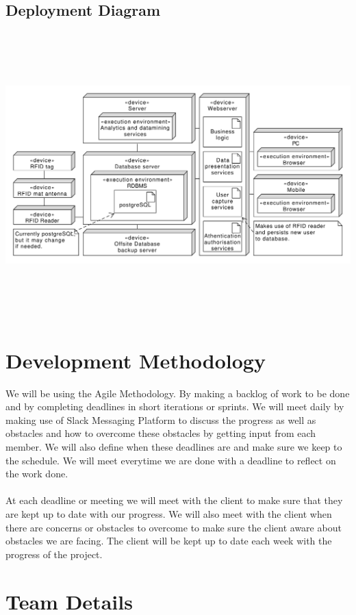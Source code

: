 \documentclass{article}
\begin{document}
\subsection{Deployment Diagram} 
\includegraphics[width=18cm,height=11cm,keepaspectratio]{ETA-Deployment.pdf}

\section{Development Methodology}
We will be using the Agile Methodology. By making a backlog of work to be done and by completing deadlines in short iterations or sprints. We will meet daily by making use of  Slack Messaging Platform to discuss the progress as well as obstacles and how to overcome these obstacles by getting input from each member. We will also define when these deadlines are and make sure we keep to the schedule. We will meet everytime we are done with a deadline to reflect on the work done. \\ \\
At each deadline or meeting we will meet with the client to make sure that they are kept up to date with our progress. We will also meet with the client when there are concerns or obstacles to overcome to make sure the client aware about obstacles we are facing. The client will be kept up to date each week with the progress of the project.


\section{Team Details}
\end{document}
